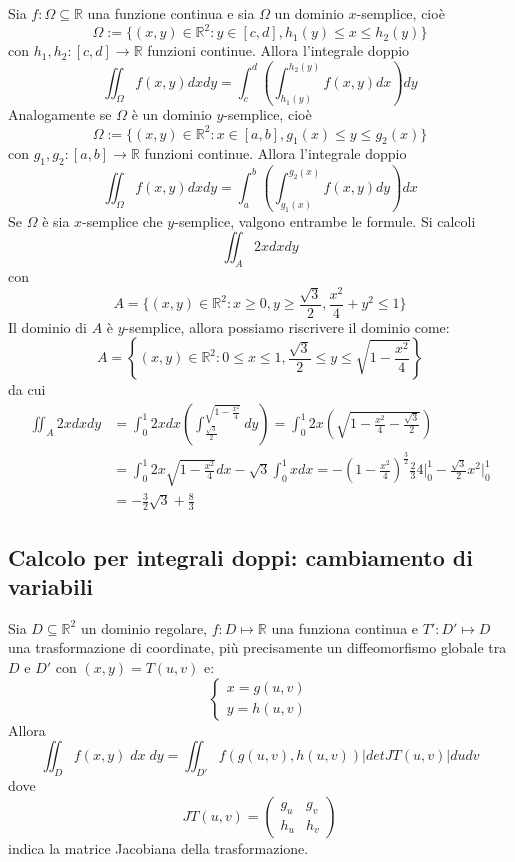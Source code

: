 \documentclass[a4paper]{article}
\numberwithin{equation}{subsection}
\begin{document}
\thm{}
{
    Sia $f: \Omega \subseteq \mathbb{R}$ una funzione continua e sia $\Omega$ un dominio $x$-semplice, cioè
    \[\Omega := \{(x,y) \in \mathbb{R}^2 : y \in [c,d], h_1(y) \le x \le h_2(y)\}\]
    con $h_1, h_2 : [c,d] \rightarrow \mathbb{R}$ funzioni continue. Allora l'integrale doppio
    \[\iint_\Omega f(x,y)dxdy = \int_c^d \left( \int_{h_1(y)}^{h_2(y)} f(x,y)dx\right)dy\] 
    Analogamente se $\Omega$ è un dominio $y$-semplice, cioè
    \[\Omega := \{(x,y) \in \mathbb{R}^2 : x \in [a,b], g_1(x) \le y \le g_2(x)\}\]
    con $g_1, g_2 : [a,b] \rightarrow \mathbb{R}$ funzioni continue. Allora l'integrale doppio
    \[\iint_\Omega f(x,y)dxdy = \int_a^b \left( \int_{g_1(x)}^{g_2(x)} f(x,y)dy\right)dx\]
    Se $\Omega$ è sia $x$-semplice che $y$-semplice, valgono entrambe le formule.
}
\ex{}
{
    Si calcoli 
    \[\iint_A 2xdxdy\]
    con
    \[A = \{(x,y) \in \mathbb{R}^2 : x \ge 0, y \ge \frac{\sqrt{3}}{2}, \frac{x^2}{4} + y^2 \le 1\}\]
    Il dominio di $A$ è $y$-semplice, allora possiamo riscrivere il dominio come:
    \[A = \left\{(x,y) \in \mathbb{R}^2 : 0 \le x \le 1, \frac{\sqrt{3}}{2} \le y \le \sqrt{1 - \frac{x^2}{4}}\right\}\]
    da cui 
    \[
    \begin{aligned}
        \iint_A 2xdxdy &= \int_0^1 2xdx \left(\int_{\frac{\sqrt{3}}{2}}^{\sqrt{1 - \frac{x^2}{4}}}dy\right) = \int_0^1 2x\left(\sqrt{1 - \frac{x^2}{4} - \frac{\sqrt{3}}{2}}\right)\\
        &= \int_0^1 2x\sqrt{1 - \frac{x^2}{4}}dx - \sqrt{3}\int_{0}^{1} x dx = - \left(1 - \frac{x^2}{4}\right)^{\frac{3}{2}} \frac{2}{3}4\Bigg|_0^1  - \frac{\sqrt{3}}{2}x^2\Bigg|_0^1\\
        &= -\frac{3}{2}\sqrt{3} + \frac{8}{3}
    \end{aligned}
    \]
}

\subsection{Calcolo per integrali doppi: cambiamento di variabili}

\thm{}
{
    Sia $D \subseteq \mathbb{R}^2$ un dominio regolare, $f : D \mapsto \mathbb{R}$ una funziona continua 
    e $T': D' \mapsto D$ una trasformazione di coordinate, più precisamente un diffeomorfismo globale tra $D$ e $D'$
    con $(x,y) = T(u,v)$ e:
    \[\begin{cases}
        x = g(u,v)\\
        y = h(u,v)
    \end{cases}\]
    Allora
    \[\iint_D f(x,y)\; dx \; dy = \iint_{D'} f(g(u,v), h(u,v))|detJT(u,v)|dudv\]
    dove
    \[JT(u,v) = \begin{pmatrix}
        g_u & g_v\\
        h_u & h_v
    \end{pmatrix}\]
    indica la matrice Jacobiana della trasformazione.
}
\end{document}
